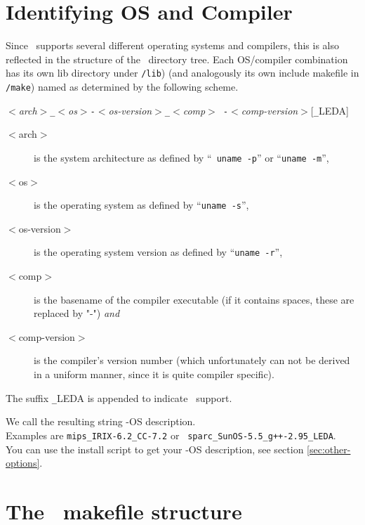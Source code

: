 \section{Identifying OS and Compiler}\label{sec:os-compiler-id}

Since \cgal\ supports several different operating systems and
compilers, this is also reflected in the structure of the \cgal\ 
directory tree. Each OS/compiler combination has its own lib directory
under \texttt{\cgaldir/lib}) (and analogously its own include makefile
in \texttt{\cgaldir/make}) named as determined by the following
scheme.
\begin{center}
  \textit{$<$arch$>$\texttt{\_}$<$os$>$\texttt{-}$<$os-version$>$\texttt{\_}$<$comp$>${\tt
    -}$<$comp-version$>$}[\texttt{\_}LEDA]
\end{center}

\begin{description}
\item[$<$arch$>$] is the system architecture as defined by ``{\tt
    uname -p}'' or ``\texttt{uname -m}'',
\item[$<$os$>$] is the operating system as defined by ``\texttt{uname
    -s}'',
\item[$<$os-version$>$] is the operating system version as defined by
  ``\texttt{uname -r}'',
\item[$<$comp$>$] is the basename of the compiler executable (if it
  contains spaces, these are replaced by "-") \textit{and}
\item[$<$comp-version$>$] is the compiler's version number (which
  unfortunately can not be derived in a uniform manner, since it is
  quite compiler specific).
\end{description}

The suffix \texttt{\_}LEDA is appended to indicate \leda\ support. 

We call the resulting string \cgal-OS description.\\ Examples are
\texttt{mips\_IRIX-6.2\_CC-7.2} or {\tt
  sparc\_SunOS-5.5\_g++-2.95\_LEDA}.\\ You can use the install script
to get your \cgal-OS description, see section \ref{sec:other-options}.

\section{The \cgal\ makefile structure}\label{sec:makefiles}

